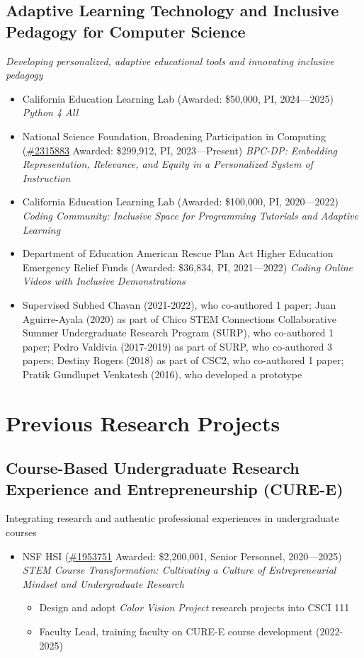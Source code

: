 \documentclass[10pt,letterpaper]{article}
\begin{document}
\subsection*{Adaptive Learning Technology and Inclusive Pedagogy for Computer Science}
\par \emph{Developing personalized, adaptive educational tools and innovating inclusive pedagogy}\par
\begin{itemize}[leftmargin=1.5em]
\item California Education Learning Lab (Awarded: \$50,000, PI, 2024---2025) \textit{Python 4 All}
\item National Science Foundation, Broadening Participation in Computing (\href{https://www.nsf.gov/awardsearch/show-award/?AWD_ID=2315883}{\#2315883} Awarded: \$299,912, PI, 2023---Present) \textit{BPC-DP: Embedding Representation, Relevance, and Equity in a Personalized System of Instruction}
\item California Education Learning Lab (Awarded: \$100,000, PI, 2020---2022) \textit{Coding Community: Inclusive Space for Programming Tutorials and Adaptive Learning}
\item Department of Education American Rescue Plan Act Higher Education Emergency Relief Funds (Awarded: \$36,834, PI, 2021---2022) \textit{Coding Online Videos with Inclusive Demonstrations}
\item Supervised Subhed Chavan (2021-2022), who co-authored 1 paper; Juan Aguirre-Ayala (2020) as part of Chico STEM Connections Collaborative Summer Undergraduate Research Program (SURP), who co-authored 1 paper; Pedro Valdivia (2017-2019) as part of SURP, who co-authored 3 papers; Destiny Rogers (2018) as part of CSC2, who co-authored 1 paper; Pratik Gundlupet Venkatesh (2016), who developed a prototype
\end{itemize}
\section*{Previous Research Projects}
\subsection*{Course-Based Undergraduate Research Experience and Entrepreneurship (CURE-E)}
Integrating research and authentic professional experiences in undergraduate courses
\begin{itemize}[leftmargin=1.5em]
\item NSF HSI (\href{https://www.nsf.gov/awardsearch/show-award/?AWD_ID=1953751}{\#1953751} Awarded: \$2,200,001, Senior Personnel, 2020---2025) \textit{STEM Course Transformation: Cultivating a Culture of Entrepreneurial Mindset and Undergraduate Research}
\begin{itemize}[leftmargin=1.5em]
\item Design and adopt \textit{Color Vision Project} research projects into CSCI 111
\item Faculty Lead, training faculty on CURE-E course development (2022-2025)
\end{itemize}
\end{itemize}
\end{document}
